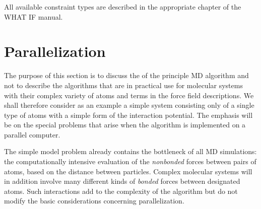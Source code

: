 All available constraint types are described in the appropriate chapter
of the WHAT IF \cite{Whatif} manual.


\section{Parallelization}
\label{sec:par}

\newcommand{\abs}[1]{\mid \! {#1} \! \mid}

The purpose of this section is to discuss the 
 of the 
principle MD algorithm and not to describe the algorithms that are in 
practical use for molecular systems with their complex variety of atoms 
and terms in the force field descriptions. We shall therefore consider 
as an example a simple system consisting only of a single type of atoms 
with a simple form of the interaction potential. The emphasis will be 
on the special problems that arise when the algorithm is implemented on 
a parallel computer. 

The simple model problem already contains the bottleneck of all MD 
simulations: the computationally intensive evaluation of the 
{\em nonbonded} forces between pairs of atoms, based on the distance 
between particles. Complex molecular systems will in addition 
involve many different kinds of {\em bonded} forces between designated 
atoms. Such interactions add to the complexity of the algorithm but do 
not modify the basic considerations concerning parallelization.


